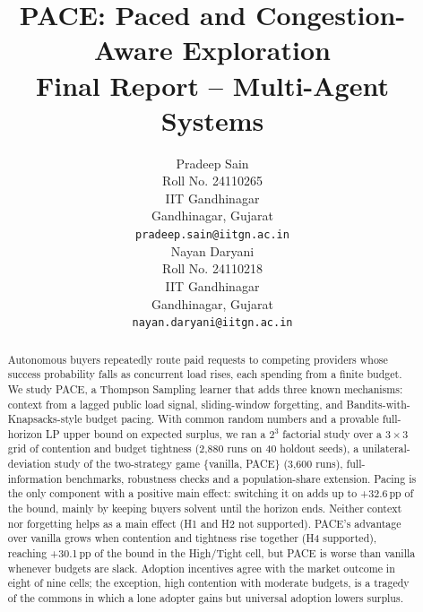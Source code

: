 \documentclass{article}
\title{PACE: Paced and Congestion-Aware Exploration\\
\Large Final Report -- Multi-Agent Systems}
\author{
  Pradeep Sain \\
  Roll No. 24110265 \\
  IIT Gandhinagar\\
  Gandhinagar, Gujarat \\
  \texttt{pradeep.sain@iitgn.ac.in} \\
  \And
  Nayan Daryani \\
  Roll No. 24110218 \\
  IIT Gandhinagar \\
  Gandhinagar, Gujarat \\
  \texttt{nayan.daryani@iitgn.ac.in} \\
}
\begin{document}
\maketitle

\begin{abstract}
Autonomous buyers repeatedly route paid requests to competing providers whose success probability falls as concurrent load rises, each spending from a finite budget. We study PACE, a Thompson Sampling learner that adds three known mechanisms: context from a lagged public load signal, sliding-window forgetting, and Bandits-with-Knapsacks-style budget pacing. With common random numbers and a provable full-horizon LP upper bound on expected surplus, we ran a $2^3$ factorial study over a $3\times3$ grid of contention and budget tightness (2,880 runs on 40 holdout seeds), a unilateral-deviation study of the two-strategy game \{vanilla, PACE\} (3,600 runs), full-information benchmarks, robustness checks and a population-share extension. Pacing is the only component with a positive main effect: switching it on adds up to +32.6\,pp of the bound, mainly by keeping buyers solvent until the horizon ends. Neither context nor forgetting helps as a main effect (H1 and H2 not supported). PACE's advantage over vanilla grows when contention and tightness rise together (H4 supported), reaching +30.1\,pp of the bound in the High/Tight cell, but PACE is worse than vanilla whenever budgets are slack. Adoption incentives agree with the market outcome in eight of nine cells; the exception, high contention with moderate budgets, is a tragedy of the commons in which a lone adopter gains but universal adoption lowers surplus.
\end{abstract}


\vspace{4pt}
\noindent{}
\end{document}
